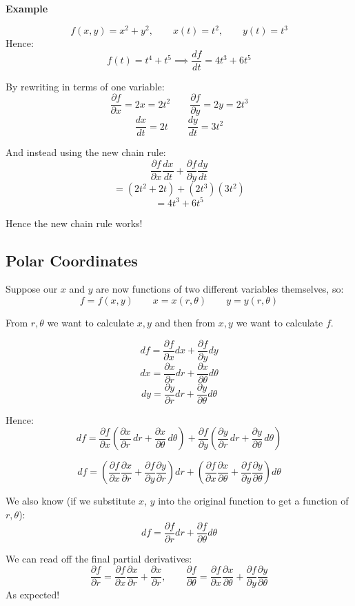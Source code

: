 \textbf{Example}

\[
    f(x, y) = x^2 + y^2, \qquad x(t) = t^2, \qquad y(t) = t^3
\]
Hence:
\[
    f(t) = t^4 + t^5 \implies \frac{df}{dt} = 4t^3 + 6t^5
\]

By rewriting in terms of one variable:
\[
    \frac{\partial f}{\partial x} = 2x = 2t^2 \qquad \frac{\partial f}{\partial y} = 2y = 2t^3
\]
\[
    \frac{dx}{dt} = 2t \qquad \frac{dy}{dt} = 3t^2
\]

And instead using the new chain rule:
\[
    \frac{\partial f}{\partial x} \frac{dx}{dt} + \frac{\partial f}{\partial y} \frac{dy}{dt}
\]
\[
    = (2t^2 + 2t) + (2t^3)(3t^2)
\]
\[
    = 4t^3 + 6t^5
\]

Hence the new chain rule works!

\subsection{Polar Coordinates}
Suppose our $x$ and $y$ are now functions of two different variables themselves, so:
\[
    f = f(x, y) \qquad x = x(r, \theta) \qquad y = y(r, \theta)
\]

From $r, \theta$ we want to calculate $x, y$ and then from $x, y$ we want to calculate $f$.

\[
    df = \frac{\partial f}{\partial x} dx + \frac{\partial f}{\partial y} dy
\]
\[
    dx = \frac{\partial x}{\partial r} dr + \frac{\partial x}{\partial \theta} d \theta
\]
\[
    dy = \frac{\partial y}{\partial r} dr + \frac{\partial y}{\partial \theta} d \theta
\]

Hence:
\[
df = \frac{\partial f}{\partial x} \left( \frac{\partial x}{\partial r} \, dr + \frac{\partial x}{\partial \theta} \, d\theta \right)
   + \frac{\partial f}{\partial y} \left( \frac{\partial y}{\partial r} \, dr + \frac{\partial y}{\partial \theta} \, d\theta \right)
\]

\[
df = \left( \frac{\partial f}{\partial x} \frac{\partial x}{\partial r} + \frac{\partial f}{\partial y} \frac{\partial y}{\partial r} \right) dr
   + \left( \frac{\partial f}{\partial x} \frac{\partial x}{\partial \theta} + \frac{\partial f}{\partial y} \frac{\partial y}{\partial \theta} \right) d\theta
\]

We also know (if we substitute $x$, $y$ into the original function to get a function of $r, \theta$):
\[
    df = \frac{\partial f}{\partial r} dr + \frac{\partial f}{\partial \theta} d \theta
\]

We can read off the final partial derivatives:
\[
    \frac{\partial f}{\partial r} = \frac{\partial f}{\partial x} \frac{\partial x}{\partial r} + \frac{\partial x}{\partial r}, \qquad \frac{\partial f}{\partial \theta} = \frac{\partial f}{\partial x} \frac{\partial x}{\partial \theta} + \frac{\partial f}{\partial y} \frac{\partial y}{\partial \theta}
\]
As expected!

